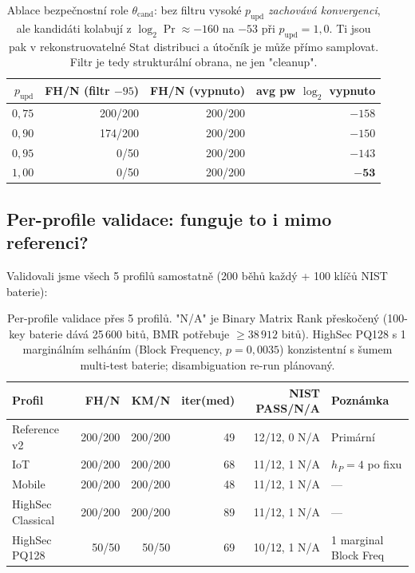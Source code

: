\documentclass[11pt,a4paper]{article}
\begin{document}
\begin{table}[ht]
\centering
\small
\begin{tabular}{rrrr}
\toprule
$p_\text{upd}$ & FH/N (filtr $-95$) & FH/N (vypnuto) & avg pw $\log_2$ vypnuto \\
\midrule
$0{,}75$ & 200/200 & 200/200 & $-158$ \\
$0{,}90$ & 174/200 & 200/200 & $-150$ \\
$0{,}95$ & 0/50 & 200/200 & $-143$ \\
$1{,}00$ & 0/50 & 200/200 & $\boldsymbol{-53}$ \\
\bottomrule
\end{tabular}
\caption{Ablace bezpečnostní role $\theta_\text{cand}$: bez filtru vysoké $p_\text{upd}$ \emph{zachovává konvergenci}, ale kandidáti kolabují z $\log_2 \Pr \approx -160$ na $-53$ při $p_\text{upd}=1{,}0$. Ti jsou pak v rekonstruovatelné Stat distribuci a útočník je může přímo samplovat. Filtr je tedy strukturální obrana, ne jen "cleanup".}
\label{tab:pop-cand-ablation}
\end{table}

\subsection{Per-profile validace: funguje to i mimo referenci?}\label{pop:exp-profiles}

Validovali jsme všech 5 profilů samostatně (200 běhů každý + 100 klíčů NIST baterie):

\begin{table}[ht]
\centering
\small
\begin{tabular}{lrrrrl}
\toprule
Profil & FH/N & KM/N & iter(med) & NIST PASS/N/A & Poznámka \\
\midrule
Reference v2 & 200/200 & 200/200 & 49 & 12/12, 0 N/A & Primární \\
IoT & 200/200 & 200/200 & 68 & 11/12, 1 N/A & $h_P=4$ po fixu \\
Mobile & 200/200 & 200/200 & 48 & 11/12, 1 N/A & --- \\
HighSec Classical & 200/200 & 200/200 & 89 & 11/12, 1 N/A & --- \\
HighSec PQ128 & 50/50 & 50/50 & 69 & 10/12, 1 N/A & 1 marginal Block Freq \\
\bottomrule
\end{tabular}
\caption{Per-profile validace přes 5 profilů. "N/A" je Binary Matrix Rank přeskočený (100-key baterie dává 25\,600 bitů, BMR potřebuje $\geq 38\,912$ bitů). HighSec PQ128 s 1 marginálním selháním (Block Frequency, $p=0{,}0035$) konzistentní s šumem multi-test baterie; disambiguation re-run plánovaný.}
\label{tab:pop-profiles-validation}
\end{table}
\end{document}
